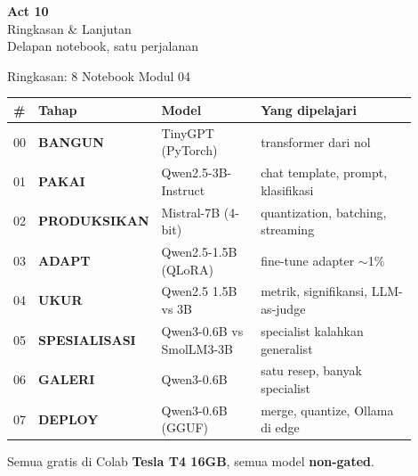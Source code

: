 \documentclass[aspectratio=169,t]{beamer}
\newcommand{\acttitle}[3]{%
  \begin{frame}[plain]
    \vspace{1.5cm}
    \begin{center}
      {\color{nvgreen}\Huge\bfseries Act #1}\\[1.2em]
      {\color{nvwhite}\Huge #2}\\[0.8em]
      {\color{nvgray}\Large #3}
    \end{center}
  \end{frame}%
}
\begin{document}
\acttitle{10}{Ringkasan \& Lanjutan}{Delapan notebook, satu perjalanan}

\begin{frame}{Ringkasan: 8 Notebook Modul 04}
  \begin{center}
  \renewcommand{\arraystretch}{1.15}
  {\footnotesize
  \setlength{\tabcolsep}{4pt}
  \begin{tabular}{@{}p{0.04\linewidth}p{0.18\linewidth}p{0.26\linewidth}p{0.42\linewidth}@{}}
    \toprule
    \rowcolor{nvcard!50}
    \textbf{\#} & \textbf{Tahap} & \textbf{Model} & \textbf{Yang dipelajari} \\
    \midrule
    00 & \textbf{BANGUN} & TinyGPT (PyTorch) & transformer dari nol \\
    01 & \textbf{PAKAI} & Qwen2.5-3B-Instruct & chat template, prompt, klasifikasi \\
    02 & \textbf{PRODUKSIKAN} & Mistral-7B (4-bit) & quantization, batching, streaming \\
    03 & \textbf{ADAPT} & Qwen2.5-1.5B (QLoRA) & fine-tune adapter $\sim$1\% \\
    04 & \textbf{UKUR} & Qwen2.5 1.5B vs 3B & metrik, signifikansi, LLM-as-judge \\
    05 & \textbf{SPESIALISASI} & Qwen3-0.6B vs SmolLM3-3B & specialist kalahkan generalist \\
    06 & \textbf{GALERI} & Qwen3-0.6B & satu resep, banyak specialist \\
    07 & \textbf{DEPLOY} & Qwen3-0.6B (GGUF) & merge, quantize, Ollama di edge \\
    \bottomrule
  \end{tabular}%
  }
  \end{center}
  \vspace{0.3em}
  \begin{center}
    \textcolor{nvlightgreen}{\small Semua gratis di Colab \textbf{Tesla T4 16GB}, semua model \textbf{non-gated}.}
  \end{center}
\end{frame}
\end{document}

